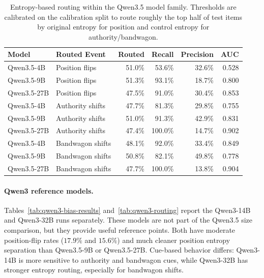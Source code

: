 \begin{table}[t]
\centering
\small
\setlength{\tabcolsep}{6pt}
\renewcommand{\arraystretch}{1.08}
\begin{tabular}{llrrrr}
\toprule
Model & Routed Event & Routed & Recall & Precision & AUC \\
\midrule
Qwen3.5-4B  & Position flips   & 51.0\% & 53.6\% & 32.6\% & 0.528 \\
Qwen3.5-9B  & Position flips   & 51.3\% & 93.1\% & 18.7\% & 0.800 \\
Qwen3.5-27B & Position flips   & 47.5\% & 91.0\% & 30.4\% & 0.853 \\
Qwen3.5-4B  & Authority shifts & 47.7\% & 81.3\% & 29.8\% & 0.755 \\
Qwen3.5-9B  & Authority shifts & 51.0\% & 91.3\% & 42.9\% & 0.831 \\
Qwen3.5-27B & Authority shifts & 47.4\% & 100.0\% & 14.7\% & 0.902 \\
Qwen3.5-4B  & Bandwagon shifts & 48.1\% & 92.0\% & 33.4\% & 0.849 \\
Qwen3.5-9B  & Bandwagon shifts & 50.8\% & 82.1\% & 49.8\% & 0.778 \\
Qwen3.5-27B & Bandwagon shifts & 47.7\% & 100.0\% & 13.8\% & 0.904 \\
\bottomrule
\end{tabular}
\caption{Entropy-based routing within the Qwen3.5 model family. Thresholds are
calibrated on the calibration split to route roughly the top half of test items
by original entropy for position and control entropy for authority/bandwagon.}
\label{tab:qwen35-routing}
\end{table}

\paragraph{Qwen3 reference models.}
Tables~\ref{tab:qwen3-bias-results} and~\ref{tab:qwen3-routing} report the
Qwen3-14B and Qwen3-32B runs separately. These models are not part of the
Qwen3.5 size comparison, but they provide useful reference points. Both have
moderate position-flip rates ($17.9\%$ and $15.6\%$) and much cleaner position
entropy separation than Qwen3.5-9B or Qwen3.5-27B. Cue-based behavior differs:
Qwen3-14B is more sensitive to authority and bandwagon cues, while Qwen3-32B
has stronger entropy routing, especially for bandwagon shifts.

